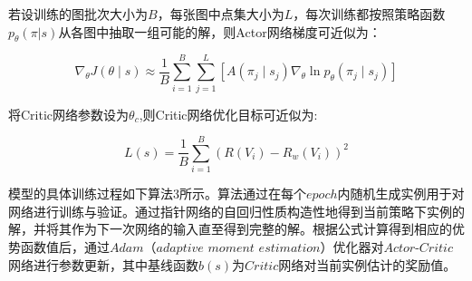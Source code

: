 \documentclass[AutoFakeBold]{LZUThesis}
\begin{document}
若设训练的图批次大小为$B$，每张图中点集大小为$L$，每次训练都按照策略函数$p_\theta(\pi|s)$从各图中抽取一组可能的解，则Actor网络梯度可近似为：

\begin{equation}
	\nabla_{\theta} J(\theta \mid s) \approx \frac{1}{B} \sum_{i=1}^{B} \sum_{j=1}^{L} \left[ A(\pi_j \mid s_j) \nabla_{\theta} \ln p_{\theta}(\pi_j \mid s_j) \right]
	\label{eq:18}
\end{equation}

将Critic网络参数设为$\theta_c$,则Critic网络优化目标可近似为:

\begin{equation}
	L(s) = \frac{1}{B} \sum_{i=1}^{B} \left( R(V_i) - R_w(V_i) \right)^2
	\label{eq:19}
\end{equation}

模型的具体训练过程如下算法$3$所示。算法通过在每个$epoch$内随机生成实例用于对网络进行训练与验证。通过指针网络的自回归性质构造性地得到当前策略下实例的解，并将其作为下一次网络的输入直至得到完整的解。根据公式计算得到相应的优势函数值后，通过$Adam$（$adaptive$ $moment$ $estimation$）优化器\cite{kingma2014adam}对$Actor$-$Critic$网络进行参数更新，其中基线函数$b(s)$为$Critic$网络对当前实例估计的奖励值。
\end{document}
